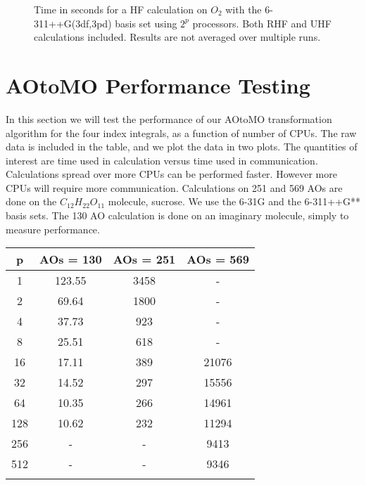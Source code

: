 \newpage

\begin{figure}[h!]
\begin{center}
\caption{Time in seconds for a HF calculation on $O_2$ with the 6-311++G(3df,3pd) basis set using $2^p$ processors. Both RHF and UHF calculations included. Results are not averaged over multiple runs.}
\label{fig:hf_performance_stuff_jesus1234}
\end{center}
\end{figure}


\section{AOtoMO Performance Testing \label{aotomoperformancetesting}}
In this section we will test the performance of our AOtoMO transformation algorithm for the four index integrals, as a function of number of CPUs. The raw data is included in the table, and we plot the data in two plots. The quantities of interest are time used in calculation versus time used in communication. Calculations spread over more CPUs can be performed faster. However more CPUs will require more communication. Calculations on 251 and 569 AOs are done on the $C_{12} H_{22} O_{11}$ molecule, sucrose. We use the 6-31G and the 6-311++G** basis sets. The 130 AO calculation is done on an imaginary molecule, simply to measure performance. \\

 \begin{center}
  \begin{tabular}{ c  c  c  c }
  \hline
     p & AOs = 130 & AOs = 251 & AOs = 569  \\ \hline
     1 & 123.55 & 3458  & - \\
     2 & 69.64 & 1800  & - \\
	 4 & 37.73 & 923  & -  \\
     8 & 25.51 & 618  & -  \\
    16 & 17.11 & 389  & 21076 \\
    32 & 14.52 & 297  & 15556 \\
    64 & 10.35 & 266  & 14961 \\
    128 & 10.62 & 232  & 11294
\\
    256 & - & -  & 9413
\\
    512 & - & -  & 9346
    
     \\ \hline \\
  \end{tabular} 
\end{center} 

